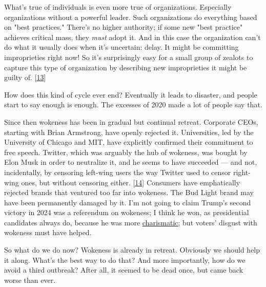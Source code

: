 What's true of individuals is even more true of
                  organizations. Especially organizations without a powerful
                  leader. Such organizations do everything based on "best
                  practices." There's no higher authority; if some new "best
                  practice" achieves critical mass, they \emph{must} adopt it.
                  And in this case the organization can't do what it usually
                  does when it's uncertain: delay. It might be committing
                  improprieties right now! So it's surprisingly easy for a small
                  group of zealots to capture this type of organization by
                  describing new improprieties it might be guilty of.
                  [\href{\#f13n}{13}]

How does this kind of cycle ever end? Eventually
                  it leads to disaster, and people start to say enough is
                  enough. The excesses of 2020 made a lot of people say that.

Since
                  then wokeness has been in gradual but continual retreat.
                  Corporate CEOs, starting with Brian Armstrong, have openly
                  rejected it. Universities, led by the University of Chicago
                  and MIT, have explicitly confirmed their commitment to free
                  speech. Twitter, which was arguably the hub of wokeness, was
                  bought by Elon Musk in order to neutralize it, and he seems to
                  have succeeded --- and not, incidentally, by censoring
                  left-wing users the way Twitter used to censor right-wing
                  ones, but without censoring either.
                  [\href{\#f14n}{14}]
                  Consumers have emphatically rejected brands that ventured too
                  far into wokeness. The Bud Light brand may have been
                  permanently damaged by it. I'm not going to claim Trump's
                  second victory in 2024 was a referendum on wokeness; I think
                  he won, as presidential candidates always do, because he was
                  more \href{http://www.paulgraham.com/charisma.html}{\underline{charismatic}}; but voters' disgust with wokeness must have helped.

So
                  what do we do now? Wokeness is already in retreat. Obviously
                  we should help it along. What's the best way to do that? And
                  more importantly, how do we avoid a third outbreak? After all,
                  it seemed to be dead once, but came back worse than ever.

